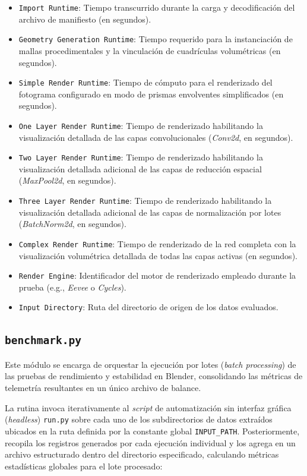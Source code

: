 \begin{itemize}
    \item \texttt{Import Runtime}: Tiempo transcurrido durante la carga y decodificación del archivo de manifiesto (en segundos).
    \item \texttt{Geometry Generation Runtime}: Tiempo requerido para la instanciación de mallas procedimentales y 
    la vinculación de cuadrículas volumétricas (en segundos).
    \item \texttt{Simple Render Runtime}: Tiempo de cómputo para el renderizado del fotograma configurado en modo de 
    prismas envolventes simplificados (en segundos).
    \item \texttt{One Layer Render Runtime}: Tiempo de renderizado habilitando la visualización detallada de las capas 
    convolucionales (\textit{Conv2d}, en segundos).
    \item \texttt{Two Layer Render Runtime}: Tiempo de renderizado habilitando la visualización detallada adicional de 
    las capas de reducción espacial (\textit{MaxPool2d}, en segundos).
    \item \texttt{Three Layer Render Runtime}: Tiempo de renderizado habilitando la visualización detallada adicional 
    de las capas de normalización por lotes (\textit{BatchNorm2d}, en segundos).
    \item \texttt{Complex Render Runtime}: Tiempo de renderizado de la red completa con la visualización volumétrica 
    detallada de todas las capas activas (en segundos).
    \item \texttt{Render Engine}: Identificador del motor de renderizado empleado durante la prueba (e.g., \textit{Eevee} o \textit{Cycles}).
    \item \texttt{Input Directory}: Ruta del directorio de origen de los datos evaluados.
\end{itemize}

\subsection{\texttt{benchmark.py}}
Este módulo se encarga de orquestar la ejecución por lotes (\textit{batch processing}) de las pruebas de rendimiento y estabilidad en Blender, consolidando las métricas de telemetría resultantes en un único archivo de balance. 
\medskip

La rutina invoca iterativamente al \textit{script} de automatización sin interfaz gráfica (\textit{headless}) \texttt{run.py} sobre cada uno de los subdirectorios de datos extraídos ubicados en la ruta definida por la constante global \texttt{INPUT\_PATH}. Posteriormente, recopila los registros generados por cada ejecución individual y los agrega en un archivo estructurado dentro del directorio especificado, calculando métricas estadísticas globales para el lote procesado:

